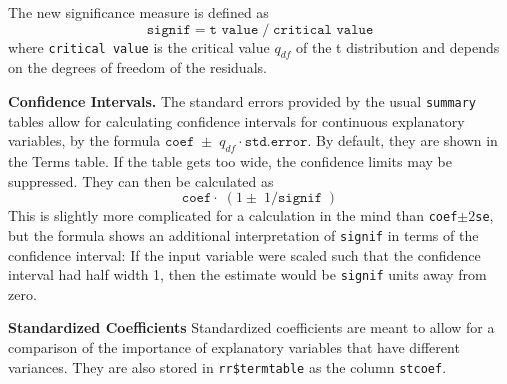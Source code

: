 \documentclass[11pt]{article}
\providecommand{\T}{\texttt}
\providecommand{\Tit}[1]{\textbf{#1}\hspace{1em}}
\begin{document}
The new significance measure is defined as
\[
  \T{signif} = \T{t value}\;/\; \T{critical value}
\]
where \T{critical value} is the critical value $q_{df}$ of the 
t distribution and depends on the degrees of freedom of the residuals. 

\Tit{Confidence Intervals.}
The standard errors provided by the usual \T{summary} tables allow for
calculating confidence intervals for continuous explanatory variables,
by the formula $\T{coef} \;\pm\; q_{df}\cdot\T{std.error}$.
By default, they are shown in the Terms table. 
If the table gets too wide, the confidence limits may be suppressed.
They can then be calculated as
\[
  \T{coef}\cdot\;(1\pm\;1/\T{signif}\;)
\]
This is slightly more complicated for a calculation in the mind than
\T{coef}$\pm 2$\T{se}, 
but the formula shows an additional interpretation of \T{signif} 
in terms of the confidence interval:
If the input variable were scaled such that the confidence interval had 
half width 1, then the estimate would be \T{signif} units away from zero.

\Tit{Standardized Coefficients}
Standardized coefficients are meant to allow for a comparison of the 
importance of explanatory variables that have different variances.
They are also stored in \T{rr\$termtable} as the column \T{stcoef}.
\end{document}
